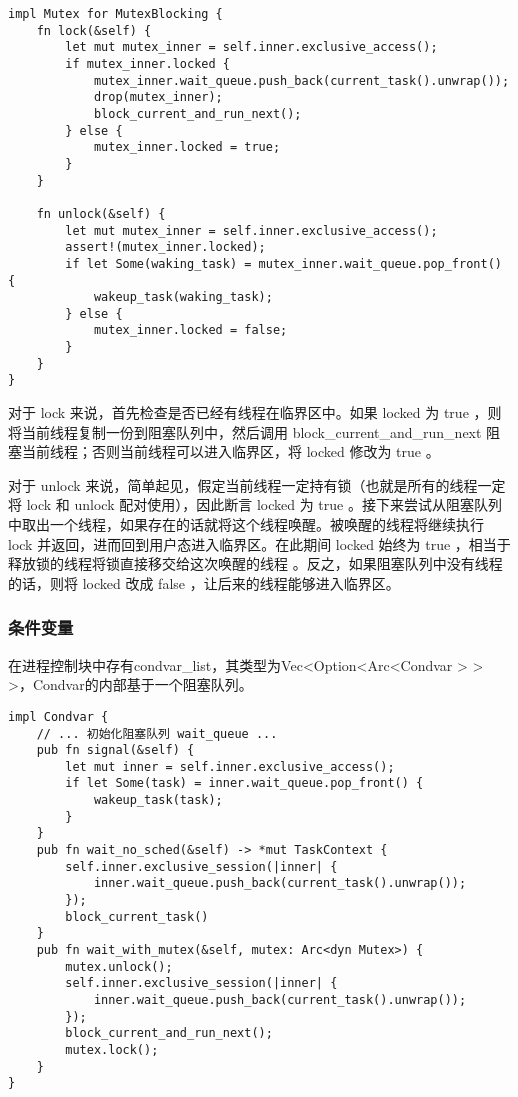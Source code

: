 \begin{lstlisting}[caption=互斥锁的实现]
impl Mutex for MutexBlocking {
    fn lock(&self) {
        let mut mutex_inner = self.inner.exclusive_access();
        if mutex_inner.locked {
            mutex_inner.wait_queue.push_back(current_task().unwrap());
            drop(mutex_inner);
            block_current_and_run_next();
        } else {
            mutex_inner.locked = true;
        }
    }

    fn unlock(&self) {
        let mut mutex_inner = self.inner.exclusive_access();
        assert!(mutex_inner.locked);
        if let Some(waking_task) = mutex_inner.wait_queue.pop_front() {
            wakeup_task(waking_task);
        } else {
            mutex_inner.locked = false;
        }
    }
}
\end{lstlisting}

对于 lock 来说，首先检查是否已经有线程在临界区中。如果 locked 为 true ，则将当前线程复制一份到阻塞队列中，然后调用 block\_current\_and\_run\_next 阻塞当前线程；否则当前线程可以进入临界区，将 locked 修改为 true 。

对于 unlock 来说，简单起见，假定当前线程一定持有锁（也就是所有的线程一定将 lock 和 unlock 配对使用），因此断言 locked 为 true 。接下来尝试从阻塞队列中取出一个线程，如果存在的话就将这个线程唤醒。被唤醒的线程将继续执行 lock 并返回，进而回到用户态进入临界区。在此期间 locked 始终为 true ，相当于 释放锁的线程将锁直接移交给这次唤醒的线程 。反之，如果阻塞队列中没有线程的话，则将 locked 改成 false ，让后来的线程能够进入临界区。


\subsubsection{条件变量}

在进程控制块中存有condvar\_list，其类型为Vec<Option<Arc<Condvar > > >，Condvar的内部基于一个阻塞队列。

\begin{lstlisting}[caption=条件变量的实现]
impl Condvar {
    // ... 初始化阻塞队列 wait_queue ...
    pub fn signal(&self) {
        let mut inner = self.inner.exclusive_access();
        if let Some(task) = inner.wait_queue.pop_front() {
            wakeup_task(task);
        }
    }
    pub fn wait_no_sched(&self) -> *mut TaskContext {
        self.inner.exclusive_session(|inner| {
            inner.wait_queue.push_back(current_task().unwrap());
        });
        block_current_task()
    }
    pub fn wait_with_mutex(&self, mutex: Arc<dyn Mutex>) {
        mutex.unlock();
        self.inner.exclusive_session(|inner| {
            inner.wait_queue.push_back(current_task().unwrap());
        });
        block_current_and_run_next();
        mutex.lock();
    }
}
\end{lstlisting}


